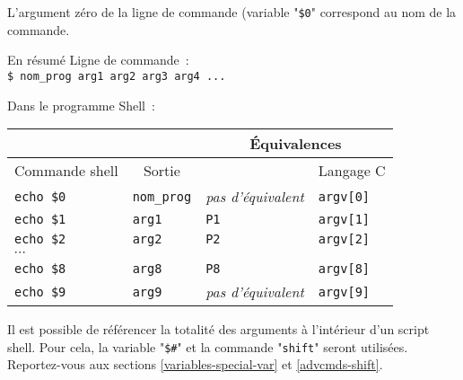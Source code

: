 L'argument z{\'e}ro de la ligne de commande (variable "\verb=$0=" correspond au
nom de la commande.

\begin{definition}{En r{\'e}sum{\'e}}
Ligne de commande~:\\
\verb=$ nom_prog arg1 arg2 arg3 arg4 ...=

Dans le programme Shell~:\\

\begin{tabular}{|l|l|l|l|}
		\hline
		\multicolumn{2}{|l|}{}					&
		\multicolumn{2}{|c|}{\'{E}quivalences}	\\
	\hline
		\multicolumn{1}{|c|}{Commande shell}	&
		\multicolumn{1}{|c|}{Sortie}			&
		\multicolumn{1}{|c|}{{\OpenVMS}}		&
		\multicolumn{1}{|c|}{Langage C}			\\
	\hline \hline
		{\tt echo \$0}					&
		{\tt nom\_prog}					&
		{\sl pas d'{\'e}quivalent}			&
		{\tt argv[0]}					\\
	\hline
		{\tt echo \$1}					&
		{\tt arg1}						&
		{\tt P1}						&
		{\tt argv[1]}					\\
	\hline
		{\tt echo \$2}					&
		{\tt arg2}						&
		{\tt P2}						&
		{\tt argv[2]}					\\
	\hline
		\multicolumn{4}{|l|}{$\cdots$}	\\
	\hline
		{\tt echo \$8}					&
		{\tt arg8}						&
		{\tt P8}						&
		{\tt argv[8]}					\\
	\hline
		{\tt echo \$9}					&
		{\tt arg9}						&
		{\sl pas d'{\'e}quivalent}			&
		{\tt argv[9]}					\\
	\hline
\end{tabular}
\end{definition}

Il est possible de r{\'e}f{\'e}rencer la totalit{\'e} des arguments
{\`a} l'int{\'e}rieur d'un script shell. Pour cela, la variable
"\verb=$#=" et la commande
"{\tt shift}" seront utilis{\'e}es.
Reportez-vous aux sections \ref{variables-special-var} et
\ref{advcmds-shift}.
